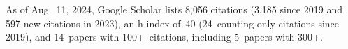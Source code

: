 %
As of Aug.~11, 2024, Google Scholar lists
8,056 citations (3,185 since 2019 and 597 new citations in 2023),
an h-index of~40 (24~counting only citations since 2019),
and 14~papers with 100+~citations, including 5~papers with 300+.
